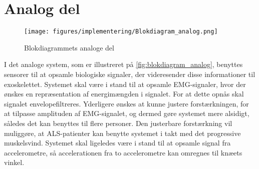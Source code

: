 \section{Analog del}
\begin{figure}[H]
\centering
\texttt{[image: figures/implementering/Blokdiagram\_analog.png]}
\caption{Blokdiagrammets analoge del}
\label{fig:blokdiagram_analog}
\end{figure}

\noindent
I det analoge system, som er illustreret på \autoref{fig:blokdiagram_analog}, benyttes sensorer til at opsamle biologiske signaler, der videresender disse informationer til exoskelettet. Systemet skal være i stand til at opsamle EMG-signaler, hvor der ønskes en repræsentation af energimængden i signalet. For at dette opnås skal signalet envelopefiltreres. Yderligere ønskes at kunne justere forstærkningen, for at tilpasse amplituden af EMG-signalet, og dermed gøre systemet mere alsidigt, således det kan benyttes til flere personer. Den justerbare forstærkning vil muliggøre, at ALS-patienter kan benytte systemet i takt med det progressive muskelsvind.
Systemet skal ligeledes være i stand til at opsamle signal fra accelerometre, så accelerationen fra to accelerometre kan omregnes til knæets vinkel.
